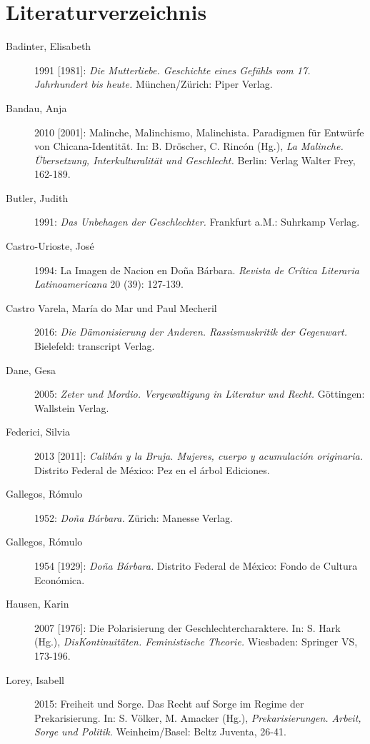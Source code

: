 %
\chapter{Literaturverzeichnis}
\label{sec:literatur}
\begin{description}

\item[Badinter, Elisabeth]1991 [1981]: \textit{Die Mutterliebe. Geschichte eines Gefühls vom 17. Jahrhundert bis heute.} München/Zürich: Piper Verlag.

\item[Bandau, Anja]2010 [2001]: Malinche, Malinchismo, Malinchista. Paradigmen für Entwürfe von Chicana-Identität. In: B. Dröscher, C. Rincón (Hg.), \textit{La Malinche. Übersetzung, Interkulturalität und Geschlecht.} Berlin: Verlag Walter Frey, 162-189.

\item[Butler, Judith]1991: \textit{Das Unbehagen der Geschlechter.} Frankfurt a.M.: Suhrkamp
Verlag.

\item[Castro-Urioste, José]1994: La Imagen de Nacion en \glqq Doña Bárbara\grqq{}. \textit{Revista de Crítica Literaria Latinoamericana} 20 (39): 127-139. 

\item[Castro Varela, María do Mar und Paul Mecheril]2016: \textit{Die Dämonisierung der Anderen. Rassismuskritik der Gegenwart.} Bielefeld: transcript Verlag.

\item[Dane, Gesa]2005: \textit{\frqq Zeter und Mordio.\flqq{} Vergewaltigung in Literatur und Recht.} Göttingen: Wallstein Verlag.

\item[Federici, Silvia]2013 [2011]: \textit{Calibán y la Bruja. Mujeres, cuerpo y acumulación originaria.} Distrito Federal de México: Pez en el árbol Ediciones.

\item[Gallegos, Rómulo]1952: \textit{Doña Bárbara.} Zürich: Manesse Verlag.

\item[Gallegos, Rómulo]1954 [1929]: \textit{Doña Bárbara.} Distrito Federal de México: Fondo de Cultura Económica.

\item[Hausen, Karin]2007 [1976]: Die Polarisierung der Geschlechtercharaktere. In: S. Hark (Hg.), \textit{DisKontinuitäten. Feministische Theorie.} Wiesbaden: Springer VS, 173-196. 

\item[Lorey, Isabell]2015: Freiheit und Sorge. Das Recht auf Sorge im Regime der Prekarisierung. In: S. Völker, M. Amacker (Hg.), \textit{Prekarisierungen. Arbeit, Sorge und Politik.} Weinheim/Basel: Beltz Juventa, 26-41.


\end{description}

